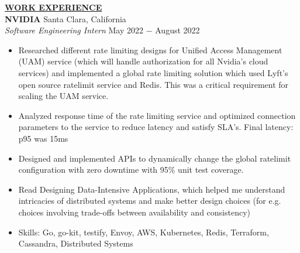 \documentclass{article}
\begin{document}
% 
%
\noindent \textbf{\underline{WORK EXPERIENCE}} \\
\noindent \textbf{NVIDIA} \hfill Santa Clara, California\\
\textit{Software Engineering Intern} \hfill May 2022 $-$ August 2022
\begin{itemize}[noitemsep,nolistsep,leftmargin=*]
	\item Researched different rate limiting designs for Unified Access Management (UAM) service (which will handle authorization for all Nvidia's cloud services) and implemented a global rate limiting solution which used Lyft's open source ratelimit service and Redis. This was a critical requirement for scaling the UAM service. 
	\item Analyzed response time of the rate limiting service and optimized connection parameters to the service to reduce latency and satisfy SLA's. Final latency: p95 was 15ms
	\item Designed and implemented APIs to dynamically change the global ratelimit configuration with zero downtime with 95\% unit test coverage.
	\item Read Designing Data-Intensive Applications, which helped me understand intricacies of distributed systems and make better design choices (for e.g. choices involving trade-offs between availability and consistency)
	\item Skills: Go, go-kit, testify, Envoy, AWS, Kubernetes, Redis, Terraform, Cassandra, Distributed Systems \\
\end{itemize}
\end{document}
